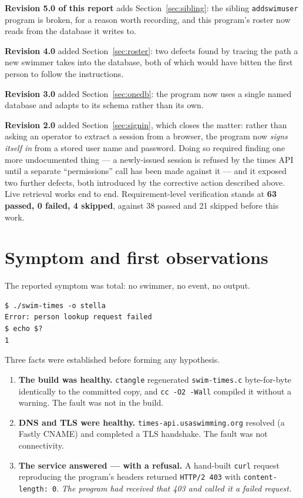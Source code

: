 \documentclass[11pt]{article}
\newcommand{\code}[1]{\texttt{#1}}
\begin{document}
\medskip
\noindent \textbf{Revision 5.0 of this report} adds
Section~\ref{sec:sibling}: the sibling \code{addswimuser} program is
broken, for a reason worth recording, and this program's roster now
reads from the database it writes to.

\medskip
\noindent \textbf{Revision 4.0} added
Section~\ref{sec:roster}: two defects found by tracing the path a new
swimmer takes into the database, both of which would have bitten the
first person to follow the instructions.

\medskip
\noindent \textbf{Revision 3.0} added
Section~\ref{sec:onedb}: the program now uses a single named database
and adapts to its schema rather than its own.

\medskip
\noindent \textbf{Revision 2.0} added
Section~\ref{sec:signin}, which closes the matter: rather than asking
an operator to extract a session from a browser, the program now
\emph{signs itself in} from a stored user name and password.  Doing so
required finding one more undocumented thing --- a newly-issued session
is refused by the times API until a separate ``permissions'' call has
been made against it --- and it exposed two further defects, both
introduced by the corrective action described above.  Live retrieval
works end to end.  Requirement-level verification stands at
\textbf{63 passed, 0 failed, 4 skipped}, against 38 passed and 21
skipped before this work.

\section{Symptom and first observations}

The reported symptom was total: no swimmer, no event, no output.

\begin{lstlisting}
$ ./swim-times -o stella
Error: person lookup request failed
$ echo $?
1
\end{lstlisting}

Three facts were established before forming any hypothesis.

\begin{enumerate}[leftmargin=*]
\item \textbf{The build was healthy.}  \code{ctangle} regenerated
      \code{swim-times.c} byte-for-byte identically to the committed
      copy, and \code{cc -O2 -Wall} compiled it without a warning.  The
      fault was not in the build.
\item \textbf{DNS and TLS were healthy.}
      \code{times-api.usaswimming.org} resolved (a Fastly CNAME) and
      completed a TLS handshake.  The fault was not connectivity.
\item \textbf{The service answered --- with a refusal.}  A hand-built
      \code{curl} request reproducing the program's headers returned
      \code{HTTP/2 403} with \code{content-length: 0}.  \emph{The
      program had received that 403 and called it a failed request.}
\end{enumerate}
\end{document}
